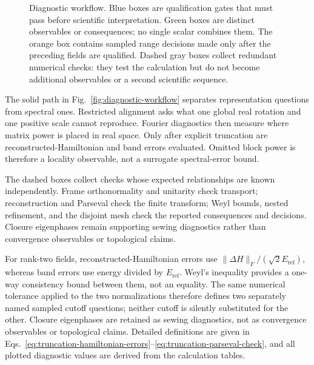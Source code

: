 \documentclass[aps,prb,reprint,amsmath,amssymb,longbibliography,floatfix]{revtex4-2}
\makeatletter
\def\label#1{\@bsphack
  \begingroup
  \UseHookWithArguments{label}{1}{#1}%
  \protected@write\@auxout{}%
    {\string\newlabel{#1}{{\@currentlabel}{\thepage}{\@currentlabelname}%
      {\@currentHref}{\@kernel@reserved@label@data}}}%
  \endgroup
  \@esphack}
\makeatother
\begin{document}
\begin{figure}[t]
\caption{Diagnostic workflow. Blue boxes are qualification gates that must pass before
scientific interpretation. Green boxes are distinct observables or consequences; no
single scalar combines them. The orange box contains sampled range decisions made only
after the preceding fields are qualified. Dashed gray boxes collect redundant numerical
checks: they test the calculation but do not become additional observables or a second
scientific sequence.}
\label{fig:diagnostic-workflow}
\end{figure}

The solid path in Fig.~\ref{fig:diagnostic-workflow} separates representation questions
from spectral ones. Restricted alignment asks what one global real rotation and one
positive scale cannot reproduce. Fourier diagnostics then measure where matrix power is
placed in real space. Only after explicit truncation are reconstructed-Hamiltonian and
band errors evaluated. Omitted block power is therefore a locality observable, not a
surrogate spectral-error bound.

The dashed boxes collect checks whose expected relationships are known independently.
Frame orthonormality and unitarity check transport; reconstruction and Parseval check the
finite transform; Weyl bounds, nested refinement, and the disjoint mesh check the
reported consequences and decisions. Closure eigenphases remain supporting sewing
diagnostics rather than convergence observables or topological claims.

For rank-two fields, reconstructed-Hamiltonian errors use
$\|\Delta H\|_F/(\sqrt{2}E_{\mathrm{ref}})$, whereas band errors use energy divided by $E_{\mathrm{ref}}$.
Weyl's inequality provides a one-way consistency bound between them, not an equality.
The same numerical tolerance applied to the two normalizations therefore defines two
separately named sampled cutoff questions; neither cutoff is silently substituted for
the other. Closure eigenphases are retained as sewing diagnostics, not as convergence
observables or topological claims. Detailed definitions are given in
Eqs.~\eqref{eq:truncation-hamiltonian-errors}--\eqref{eq:truncation-parseval-check}, and
all plotted diagnostic values are derived from the calculation tables.
\end{document}
